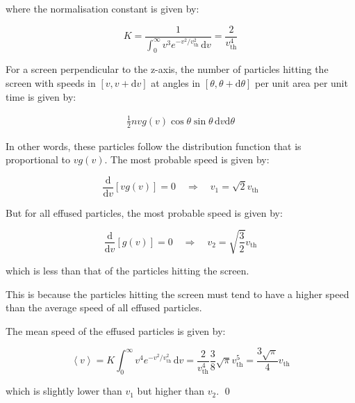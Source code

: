 \documentclass[12pt]{article}
\begin{document}
where the normalisation constant is given by:

\begin{equation}
    K = \frac{1}{\int_{0}^{\infty} v^{3} e^{-v^{2}/v_{\text{th}}^{2}} \, \mathrm{d}v} = \frac{2}{v_{\text{th}}^{4}}
\end{equation}

For a screen perpendicular to the z-axis, the number of particles hitting the screen with speeds in $[v, v + \mathrm{d}v]$ at angles in $[\theta, \theta + \mathrm{d}\theta]$ per unit area per unit time is given by:

\begin{equation}
    \begin{split}
        \frac{1}{2} nv g(v) \cos{\theta} \sin{\theta} \, \mathrm{d}v \mathrm{d}\theta
    \end{split}
\end{equation}

In other words, these particles follow the distribution function that is proportional to $v g(v)$. The most probable speed is given by:

\begin{equation}
    \frac{\mathrm{d}}{\mathrm{d}v} \left[ v g(v) \right] = 0 \quad \Rightarrow \quad v_{1} = \sqrt{2} v_{\text{th}}
\end{equation}

But for all effused particles, the most probable speed is given by:

\begin{equation}
    \frac{\mathrm{d}}{\mathrm{d}v} \left[ g(v) \right] = 0 \quad \Rightarrow \quad v_{2} = \sqrt{\frac{3}{2}} v_{\text{th}}
\end{equation}

which is less than that of the particles hitting the screen.

This is because the particles hitting the screen must tend to have a higher speed than the average speed of all effused particles.

The mean speed of the effused particles is given by:

\begin{equation}
    \left\langle v \right\rangle = K \int_{0}^{\infty} v^{4} e^{-v^{2}/v_{\text{th}}^{2}} \, \mathrm{d}v = \frac{2}{v_{\text{th}}^{4}} \frac{3}{8} \sqrt{\pi} v_{\text{th}}^{5} = \frac{3\sqrt{\pi}}{4} v_{\text{th}}
\end{equation}

which is slightly lower than $v_{1}$ but higher than $v_{2}$.
\qed
\end{document}
